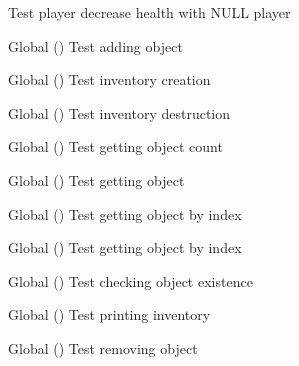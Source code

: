 \begin{DoxyRefList}
\label{test__test000113}%
%
Test player decrease health with NULL player  
\item[Global \doxylink{inventory__test_8c_aa71b62b43df77830d47caa4237ee76a2}{test2\+\_\+inventory\+\_\+add\+\_\+object} ()]\label{test__test000035}%
%
Test adding object  
\item[Global \doxylink{inventory__test_8c_a73a6080c360a8870c4ffc734e989c8b3}{test2\+\_\+inventory\+\_\+create} ()]\label{test__test000031}%
%
Test inventory creation  
\item[Global \doxylink{inventory__test_8c_a9f3daec28c696c0671e6a3e905359741}{test2\+\_\+inventory\+\_\+destroy} ()]\label{test__test000033}%
%
Test inventory destruction  
\item[Global \doxylink{inventory__test_8c_a6ae6ac8b8bc479c81fe89c2e3b4133b0}{test2\+\_\+inventory\+\_\+get\+\_\+num\+\_\+objects} ()]\label{test__test000043}%
%
Test getting object count  
\item[Global \doxylink{inventory__test_8c_a6a440546c4b5335db5bb0e93688bf847}{test2\+\_\+inventory\+\_\+get\+\_\+object} ()]\label{test__test000037}%
%
Test getting object  
\item[Global \doxylink{inventory__test_8c_ac9cca4e85679d9f8c965a410357ae64a}{test2\+\_\+inventory\+\_\+get\+\_\+object\+\_\+by\+\_\+index} ()]\label{test__test000045}%
%
Test getting object by index  
\item[Global \doxylink{inventory__test_8c_a2a77a546e0f46a719124f96bddf1379d}{test2\+\_\+inventory\+\_\+get\+\_\+object\+\_\+index} ()]\label{test__test000047}%
%
Test getting object by index  
\item[Global \doxylink{inventory__test_8c_a7b74f975c41051fab9f54bc1e84ec545}{test2\+\_\+inventory\+\_\+has\+\_\+object} ()]\label{test__test000041}%
%
Test checking object existence  
\item[Global \doxylink{inventory__test_8c_ab416dcaf2ae0f9852a8c6ed5eea4f408}{test2\+\_\+inventory\+\_\+print} ()]\label{test__test000051}%
%
Test printing inventory  
\item[Global \doxylink{inventory__test_8c_a4ea1bbd9668f1049fb98590ffb0dd5db}{test2\+\_\+inventory\+\_\+remove\+\_\+object} ()]\label{test__test000039}%
%
Test removing object  

\end{DoxyRefList}
